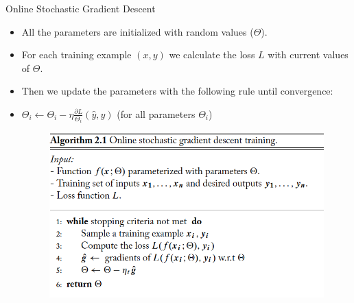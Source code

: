 \documentclass[handout]{beamer}
\begin{document}
\begin{frame}{Online Stochastic Gradient Descent}

\begin{scriptsize}
\begin{itemize}
\item All the parameters are initialized with random values ($\Theta$).
\item For each training example $(x,y)$ we calculate the loss $L$ with current values of $\Theta$.
\item Then we update the parameters with the following rule until convergence:
\item $\Theta_i \leftarrow \Theta_i - \eta \frac{\partial L}{\Theta_i}(\hat{y},y)$  (for all parameters $\Theta_i$)

\begin{figure}[htb]
	\centering
	 \includegraphics[scale=0.3]{pics/Online-SGD.png}
\end{figure}

\end{itemize}



\end{scriptsize}


\end{frame}
\end{document}
